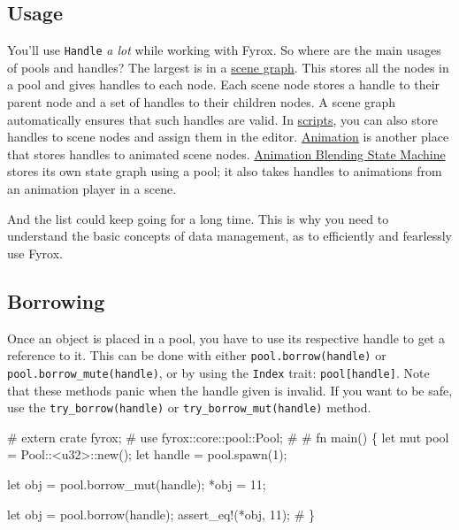 \documentclass[
]{book}
\newenvironment{Shaded}{\begin{snugshade}}{\end{snugshade}}
\newcommand{\NormalTok}[1]{#1}
\theoremstyle{definition}
\theoremstyle{definition}
\theoremstyle{definition}
\theoremstyle{definition}
\theoremstyle{remark}
\begin{document}
\subsection{Usage}\label{usage}

You'll use \texttt{Handle} \emph{a lot} while working with Fyrox. So where are the main usages of pools and handles? The largest is in a \href{../scene/graph.md}{scene graph}. This stores all the nodes in a pool and gives handles to each node. Each scene node stores a handle to their parent node and a set of handles to their children nodes. A scene graph automatically ensures that such handles are valid. In \href{../scripting/script.md}{scripts}, you can also store handles to scene nodes and assign them in the editor. \href{../animation/animation.md}{Animation} is another place that stores handles to animated scene nodes. \href{../animation/blending.md}{Animation Blending State Machine} stores its own state graph using a pool; it also takes handles to animations from an animation player in a scene.

And the list could keep going for a long time. This is why you need to understand the basic concepts of data management, as to efficiently and fearlessly use Fyrox.

\subsection{Borrowing}\label{borrowing}

Once an object is placed in a pool, you have to use its respective handle to get a reference to it. This can be done with either \texttt{pool.borrow(handle)} or \texttt{pool.borrow\_mute(handle)}, or by using the \texttt{Index} trait: \texttt{pool{[}handle{]}}. Note that these methods panic when the handle given is invalid. If you want to be safe, use the \texttt{try\_borrow(handle)} or \texttt{try\_borrow\_mut(handle)} method.

\begin{Shaded}
\begin{Highlighting}[]
\NormalTok{\# extern crate fyrox;}
\NormalTok{\# use fyrox::core::pool::Pool;}
\NormalTok{\#}
\NormalTok{\# fn main() \{}
\NormalTok{let mut pool = Pool::\textless{}u32\textgreater{}::new();}
\NormalTok{let handle = pool.spawn(1);}

\NormalTok{let obj = pool.borrow\_mut(handle);}
\NormalTok{*obj = 11;}

\NormalTok{let obj = pool.borrow(handle);}
\NormalTok{assert\_eq!(*obj, 11);}
\NormalTok{\# \}}
\end{Highlighting}
\end{Shaded}
\end{document}
